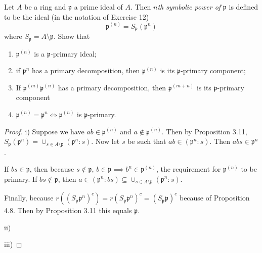 \begin{exercise}
	Let $A$ be a ring and $\mathfrak{p}$ a prime ideal of $A$. Then \textit{$n$th symbolic power of} $\mathfrak{p}$ is defined to be the ideal (in the notation of Exercise 12)
	\[
		\mathfrak{p}^{(n)} = S_\mathfrak{p}(\mathfrak{p}^n)
	\]
	where $S_\mathfrak{p} = A \setminus \mathfrak{p}$. Show that
	\begin{enumerate}
		\item $\mathfrak{p}^{(n)}$ is a $\mathfrak{p}$-primary ideal;
		\item if $\mathfrak{p}^n$ has a primary decomposition, then $\mathfrak{p}^{(n)}$ is its $\mathfrak{p}$-primary component;
		\item If $\mathfrak{p}^{(m)}\mathfrak{p}^{(n)}$ has a primary decomposition, then $\mathfrak{p}^{(m+n)}$ is its $\mathfrak{p}$-primary component
		\item $\mathfrak{p}^{(n)} = \mathfrak{p}^n \iff \mathfrak{p}^{(n)}$ is $\mathfrak{p}$-primary.
	\end{enumerate}
\end{exercise}
\begin{proof}
	i) Suppose we have $ab \in \mathfrak{p}^{(n)}  $ and $a\notin \mathfrak{p}^{(n)}  $.
	Then by Proposition 3.11, $S_{\mathfrak{p}}(\mathfrak{p}^n) = \cup_{s \in A \setminus \mathfrak{p}} (\mathfrak{p}^{n} :s) $.
	Now let $s $ be such that $ab \in (\mathfrak{p}^n:s) $.
	Then $ab s \in \mathfrak{p}^n$.

	If $bs \in \mathfrak{p} $, then because $s\notin \mathfrak{p} $, $b \in \mathfrak{p} \implies b^n \in \mathfrak{p}^{(n)}  $, the requirement for $\mathfrak{p}^{(n)}  $ to be primary.
	If $bs \notin \mathfrak{p} $, then $a\in (\mathfrak{p}^n:bs) \subseteq \cup_{s\in A \setminus \mathfrak{p}} (\mathfrak{p}^n: s) $.

	Finally, because $r((S_{\mathfrak{p}}\mathfrak{p}^n)^c) = r(S_{\mathfrak{p}}\mathfrak{p}^n)^c = (S_{\mathfrak{p}}\mathfrak{p})^c $ because of Proposition 4.8.
	Then by Proposition 3.11 this equals $\mathfrak{p} $.

	ii) 

	iii) 
\end{proof}

